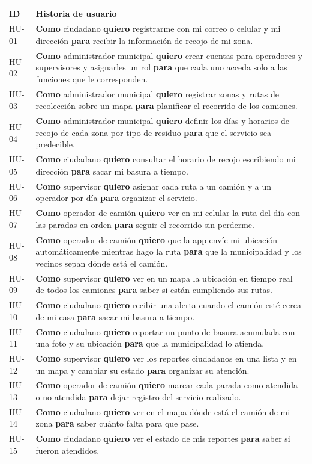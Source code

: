 \documentclass[11pt,a4paper]{article}
\newcommand{\hu}[3]{\textbf{Como} #1 \textbf{quiero} #2 \textbf{para} #3}
\begin{document}
{\small
\begin{longtable}{C{1.3cm} L{14.3cm}}
\toprule
\textbf{ID} & \textbf{Historia de usuario} \\
\midrule
\endhead
HU-01 & \hu{ciudadano}{registrarme con mi correo o celular y mi dirección}{recibir la información de recojo de mi zona.} \\
HU-02 & \hu{administrador municipal}{crear cuentas para operadores y supervisores y asignarles un rol}{que cada uno acceda solo a las funciones que le corresponden.} \\
HU-03 & \hu{administrador municipal}{registrar zonas y rutas de recolección sobre un mapa}{planificar el recorrido de los camiones.} \\
HU-04 & \hu{administrador municipal}{definir los días y horarios de recojo de cada zona por tipo de residuo}{que el servicio sea predecible.} \\
HU-05 & \hu{ciudadano}{consultar el horario de recojo escribiendo mi dirección}{sacar mi basura a tiempo.} \\
HU-06 & \hu{supervisor}{asignar cada ruta a un camión y a un operador por día}{organizar el servicio.} \\
HU-07 & \hu{operador de camión}{ver en mi celular la ruta del día con las paradas en orden}{seguir el recorrido sin perderme.} \\
HU-08 & \hu{operador de camión}{que la app envíe mi ubicación automáticamente mientras hago la ruta}{que la municipalidad y los vecinos sepan dónde está el camión.} \\
HU-09 & \hu{supervisor}{ver en un mapa la ubicación en tiempo real de todos los camiones}{saber si están cumpliendo sus rutas.} \\
HU-10 & \hu{ciudadano}{recibir una alerta cuando el camión esté cerca de mi casa}{sacar mi basura a tiempo.} \\
HU-11 & \hu{ciudadano}{reportar un punto de basura acumulada con una foto y su ubicación}{que la municipalidad lo atienda.} \\
HU-12 & \hu{supervisor}{ver los reportes ciudadanos en una lista y en un mapa y cambiar su estado}{organizar su atención.} \\
HU-13 & \hu{operador de camión}{marcar cada parada como atendida o no atendida}{dejar registro del servicio realizado.} \\
HU-14 & \hu{ciudadano}{ver en el mapa dónde está el camión de mi zona}{saber cuánto falta para que pase.} \\
HU-15 & \hu{ciudadano}{ver el estado de mis reportes}{saber si fueron atendidos.} \\

\end{longtable}}
\end{document}
